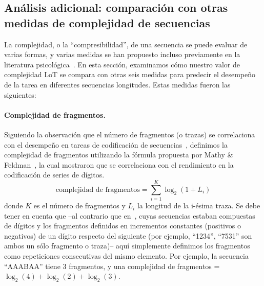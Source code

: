 \subsection{Análisis adicional: comparación con otras medidas de complejidad de secuencias}


La complejidad, o la ``compresibilidad'', de una secuencia se puede evaluar de varias formas, y varias medidas se han propuesto incluso previamente en la literatura psicológica~\cite{f17,f30,f34,f41,f44,f95,f96,f97,f98}. En esta sección, examinamos cómo nuestro valor de complejidad LoT se compara con otras seis medidas para predecir el desempeño de la tarea en diferentes secuencias longitudes. Estas medidas fueron las siguientes:


\paragraph{Complejidad de fragmentos.} Siguiendo la observación que el número de fragmentos (o trazas) se correlaciona con el desempeño en tareas de codificación de secuencias~\cite{f34}, definimos la complejidad de fragmentos utilizando la fórmula propuesta por Mathy \& Feldman~\cite{f34}, la cual mostraron que se correlaciona con el rendimiento en la codificación de series de dígitos. 
$$
\text{complejidad de fragmentos} = \sum_{i = 1}^{K} \log_2(1+L_i) 
$$
donde $K$ es el número de fragmentos y $L_i$ la longitud de la i-ésima traza. Se debe tener en cuenta que --al contrario que en~\cite{f34}, cuyas secuencias estaban compuestas de dígitos y los fragmentos definidos en incrementos constantes (positivos o negativos) de un dígito respecto del siguiente (por ejemplo, ``1234'', ``7531'' son ambos un sólo fragmento o traza)-- aquí simplemente definimos los fragmentos como repeticiones consecutivas del mismo elemento. Por ejemplo, la secuencia ``AAABAA'' tiene 3 fragmentos, y una complejidad de fragmentos = $\log_2(4) + \log_2(2) + \log_2(3)$.


